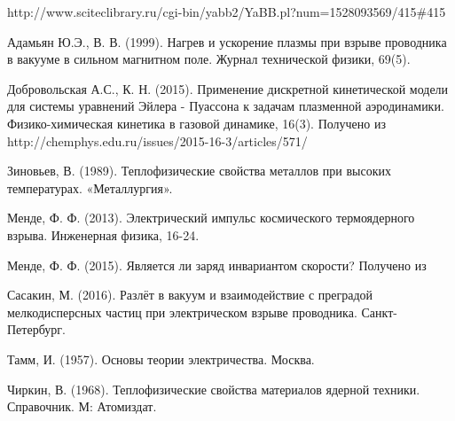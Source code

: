 ﻿\documentclass[12pt, letterpaper]{article}
\begin{document}
http://www.sciteclibrary.ru/cgi-bin/yabb2/YaBB.pl?num=1528093569/415\#415

Адамьян Ю.Э., В. В. (1999). Нагрев и ускорение плазмы при взрыве проводника в вакууме в сильном магнитном поле. Журнал технической физики, 69(5).

Добровольская А.С., К. Н. (2015). Применение дискретной кинетической модели для системы уравнений Эйлера - Пуассона к задачам плазменной аэродинамики. Физико-химическая кинетика в газовой динамике, 16(3). Получено из http://chemphys.edu.ru/issues/2015-16-3/articles/571/

Зиновьев, В. (1989). Теплофизические свойства металлов при высоких температурах. «Металлургия».

Менде, Ф. Ф. (2013). Электрический импульс космического термоядерного взрыва. Инженерная физика, 16-24.

Менде, Ф. Ф. (2015). Является ли заряд инвариантом скорости? Получено из %

Сасакин, М. (2016). Разлёт в вакуум и взаимодействие с преградой мелкодисперсных частиц при электрическом взрыве проводника. Санкт-Петербург.

Тамм, И. (1957). Основы теории электричества. Москва.

Чиркин, В. (1968). Теплофизические свойства материалов ядерной техники. Справочник. М: Атомиздат.
\end{document}
